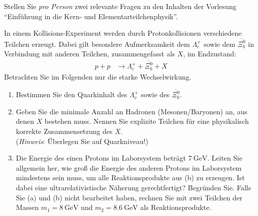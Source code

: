 \documentclass{exercise}
\begin{document}
\clearpage
\makeheader

Stellen Sie \emph{pro Person} zwei relevante Fragen zu den Inhalten der Vorlesung \enquote{Einf\"uhrung in die Kern- und Elementarteilchenphysik}.


    In einem Kollisions-Experiment werden durch Protonkollisionen verschiedene Teilchen erzeugt. Dabei gilt besondere Aufmerksamkeit dem $\Lambda_c^+$ sowie dem $\overline{\Xi^{0}_{b}}$ in Verbindung mit anderen Teilchen, zusammengefasst als $X$, im Endzustand:
    \begin{align*}
    p+p & \rightarrow \Lambda_c^+ + \overline{\Xi^{0}_{b}}+X
    \end{align*}
    Betrachten Sie im Folgenden nur die starke Wechselwirkung.
    \begin{enumerate}
        \item Bestimmen Sie den Quarkinhalt des $\Lambda_c^+$ sowie des $\overline{\Xi^{0}_{b}}$.  
        \item Geben Sie die minimale Anzahl an Hadronen (Mesonen/Baryonen) an, aus denen $X$ bestehen muss. Nennen Sie explizite Teilchen für eine physikalisch korrekte Zusammensetzung des $X$. \\ (\emph{Hinweis}: Überlegen Sie auf Quarkniveau!)
        \item Die Energie des einen Protons im Laborsystem beträgt $\SI{7}{\giga\electronvolt}$. Leiten Sie allgemein her, wie groß die Energie des anderen Protons im Laborsystem mindestens sein muss, um alle Reaktionsprodukte aus (b) zu erzeugen. Ist dabei eine ultrarelativistische Näherung gerechtfertigt? Begründen Sie. Falls Sie (a) und (b) nicht bearbeitet haben, rechnen Sie mit zwei Teilchen der Massen $m_1 = \SI{8}{\giga\electronvolt}$ und $m_2 = \SI{8.6}{\giga\electronvolt}$ als Reaktionsprodukte.
    \end{enumerate}
\end{document}
